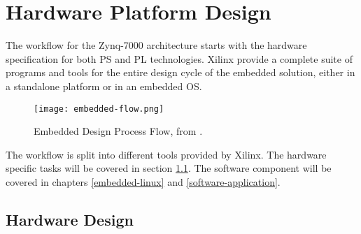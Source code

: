 %  
%  
%  
%  
%  
%  

\chapter{Hardware Platform Design}

The workflow for the Zynq-7000 architecture starts with the hardware specification for both PS and
PL technologies. Xilinx provide a complete suite of programs and tools for the entire design cycle
of the embedded solution, either in a standalone platform or in an embedded OS.

\begin{figure}[htp]
	\centering
	\texttt{[image: embedded-flow.png]}
	\caption{Embedded Design Process Flow, from \cite{UG1043}.} \label{fig:embedded-flow}
\end{figure}%

The workflow is split into different tools provided by Xilinx. The hardware specific tasks will be
covered in section \ref{hardware-design}. The software component will be covered in chapters
\ref{embedded-linux} and \ref{software-application}.

\section{Hardware Design} \label{hardware-design}

